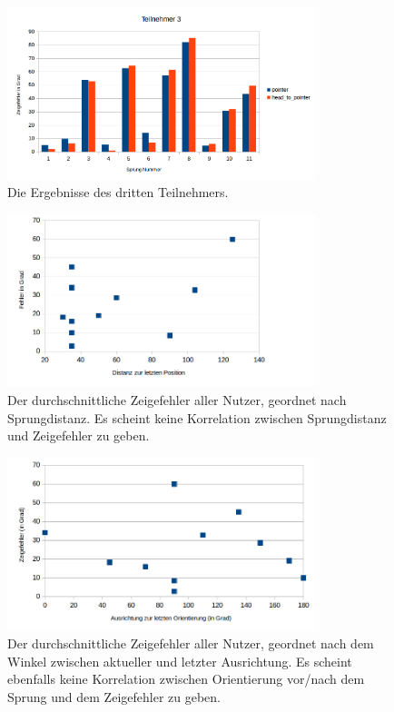 \begin{figure}[]
  \centering
  \includegraphics[width=0.8\textwidth]{images/teilnehmer3.png}
  \caption{Die Ergebnisse des dritten Teilnehmers.}
  \label{fig:todo}
\end{figure}


\begin{figure}[]
  \centering
  \includegraphics[width=0.8\textwidth]{images/fehlernachdistanz.png}
  \caption{Der durchschnittliche Zeigefehler aller Nutzer, geordnet nach Sprungdistanz. Es scheint keine Korrelation zwischen Sprungdistanz und Zeigefehler zu geben.}
  \label{fig:todo}
\end{figure}


\begin{figure}[]
  \centering
  \includegraphics[width=0.8\textwidth]{images/fehlernachausrichtung.png}
  \caption{Der durchschnittliche Zeigefehler aller Nutzer, geordnet nach dem Winkel zwischen aktueller und letzter Ausrichtung. Es scheint ebenfalls keine Korrelation zwischen Orientierung vor/nach dem Sprung und dem Zeigefehler zu geben.}
  \label{fig:todo}
\end{figure}



